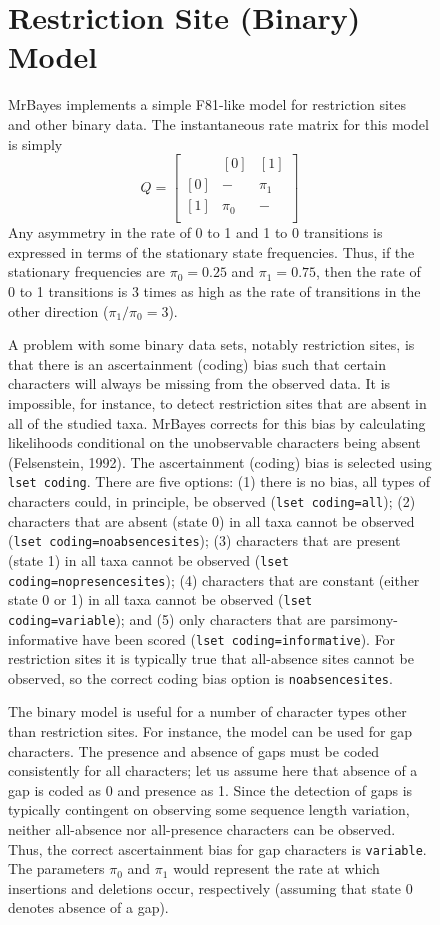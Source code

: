 \documentclass[12pt]{book}
\newcommand{\ttt}[1]{\texttt{#1}}
\begin{document}
\begin{figure}[h]
\section{Restriction Site (Binary) Model}

MrBayes implements a simple F81-like model for restriction sites and other binary data. The
instantaneous rate matrix for this model is simply
\[
Q=\begin{bmatrix}
    & [0] & [1]\\
 [0]& - & \pi_{1}\\
 [1]&  \pi_{0}& - \\
\end{bmatrix}
\]
Any asymmetry in the rate of 0 to 1 and 1 to 0 transitions is expressed in terms of the stationary
state frequencies. Thus, if the stationary frequencies are $\pi_0 = 0.25$ and $\pi_1 = 0.75$, then
the rate of 0 to 1 transitions is 3 times as high as the rate of transitions in the other direction
($\pi_1 / \pi_0 = 3$).

A problem with some binary data sets, notably restriction sites, is that there is an ascertainment
(coding) bias such that certain characters will always be missing from the observed data. It is
impossible, for instance, to detect restriction sites that are absent in all of the studied taxa.
MrBayes corrects for this bias by calculating likelihoods conditional on the unobservable
characters being absent (Felsenstein, 1992). The ascertainment (coding) bias is selected using
\ttt{lset coding}. There are five options: (1) there is no bias, all types of characters could, in
principle, be observed (\ttt{lset coding=all}); (2) characters that are absent (state 0) in all
taxa cannot be observed (\ttt{lset coding=noabsencesites}); (3) characters that are present (state
1) in all taxa cannot be observed (\ttt{lset coding=nopresencesites}); (4) characters that are
constant (either state 0 or 1) in all taxa cannot be observed (\ttt{lset coding=variable}); and (5)
only characters that are parsimony-informative have been scored (\ttt{lset coding=informative}).
For restriction sites it is typically true that all-absence sites cannot be observed, so the
correct coding bias option is \ttt{noabsencesites}.

The binary model is useful for a number of character types other than restriction sites. For
instance, the model can be used for gap characters. The presence and absence of gaps must be coded
consistently for all characters; let us assume here that absence of a gap is coded as 0 and
presence as 1. Since the detection of gaps is typically contingent on observing some sequence
length variation, neither all-absence nor all-presence characters can be observed. Thus, the
correct ascertainment bias for gap characters is \ttt{variable}. The parameters $\pi_0$ and $\pi_1$
would represent the rate at which insertions and deletions occur, respectively (assuming that state
0 denotes absence of a gap).


\end{figure}
\end{document}
